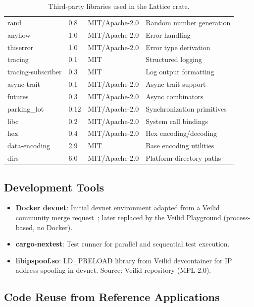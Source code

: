 \begin{table}[H]
\begin{tabular}{llll}
rand            & 0.8            & MIT/Apache-2.0 & Random number generation \\
anyhow          & 1.0            & MIT/Apache-2.0 & Error handling \\
thiserror       & 1.0            & MIT/Apache-2.0 & Error type derivation \\
tracing         & 0.1            & MIT            & Structured logging \\
tracing-subscriber & 0.3         & MIT            & Log output formatting \\
async-trait     & 0.1            & MIT/Apache-2.0 & Async trait support \\
futures         & 0.3            & MIT/Apache-2.0 & Async combinators \\
parking\_lot    & 0.12           & MIT/Apache-2.0 & Synchronization primitives \\
libc            & 0.2            & MIT/Apache-2.0 & System call bindings \\
hex             & 0.4            & MIT/Apache-2.0 & Hex encoding/decoding \\
data-encoding   & 2.9            & MIT            & Base encoding utilities \\
dirs            & 6.0            & MIT/Apache-2.0 & Platform directory paths \\
\bottomrule
\end{tabular}
\caption{Third-party libraries used in the Lattice crate.}
\label{tab:reuse}
\end{table}

\subsection*{Development Tools}

\begin{itemize}[noitemsep]
  \item \textbf{Docker devnet}: Initial devnet environment adapted from a Veilid community merge request~\cite{veilid-devnet-mr444}; later replaced by the Veilid Playground (process-based, no Docker).
  \item \textbf{cargo-nextest}: Test runner for parallel and sequential test execution.
  \item \textbf{libipspoof.so}: LD\_PRELOAD library from Veilid devcontainer for IP address spoofing in devnet. Source: Veilid repository (MPL-2.0).
\end{itemize}

\subsection*{Code Reuse from Reference Applications}

